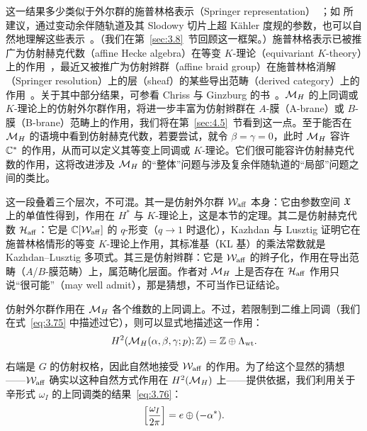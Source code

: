 这一结果多少类似于外尔群的施普林格表示（Springer representation）~\cite{ref26}；如 \cite{ref31} 所建议，通过变动余伴随轨道及其 Slodowy 切片上超 Kähler 度规的参数，也可以自然地理解这些表示~\cite{ref35}。（我们在第~\ref{sec:3.8}~节回顾这一框架。）施普林格表示已被推广为仿射赫克代数（affine Hecke algebra）在等变 $K$-理论（equivariant $K$-theory）上的作用~\cite{ref27,ref28}，最近又被推广为仿射辫群（affine braid group）在施普林格消解（Springer resolution）上的层（sheaf）的某些导出范畴（derived category）上的作用~\cite{ref29}。关于其中部分结果，可参看 Chriss 与 Ginzburg 的书~\cite{ref30}。${{\mathcal{M}}_H}$ 的上同调或 $K$-理论上的仿射外尔群作用，将进一步丰富为仿射辫群在 $A$-膜（A-brane）或 $B$-膜（B-brane）范畴上的作用，我们将在第~\ref{sec:4.5}~节看到这一点。至于能否在 ${{\mathcal{M}}_H}$ 的语境中看到仿射赫克代数，若要尝试，就令 $\beta=\gamma=0$，此时 ${{\mathcal{M}}_H}$ 容许 ${\mathbb{C}}^*$ 的作用，从而可以定义其等变上同调或 $K$-理论。它们很可能容许仿射赫克代数的作用，这将改进涉及 ${{\mathcal{M}}_H}$ 的“整体”问题与涉及复余伴随轨道的“局部”问题之间的类比。

\begin{yizhu}[易错点]
这一段叠着三个层次，不可混。其一是仿射外尔群 ${\mathcal W}_{\rm aff}$ 本身：它由参数空间 $\mathfrak{X}$ 上的单值性得到，作用在 $H^*$ 与 $K$-理论上，这是本节的定理。其二是仿射赫克代数 $\mathcal H_{\rm aff}$：它是 ${\mathbb{C}}[{\mathcal W}_{\rm aff}]$ 的 $q$-形变（$q\to1$ 时退化），Kazhdan 与 Lusztig 证明它在施普林格情形的等变 $K$-理论上作用，其标准基（KL 基）的乘法常数就是 Kazhdan--Lusztig 多项式。其三是仿射辫群：它是 ${\mathcal W}_{\rm aff}$ 的辫子化，作用在导出范畴（$A$/$B$-膜范畴）上，属范畴化层面。作者对 ${{\mathcal{M}}_H}$ 上是否存在 $\mathcal H_{\rm aff}$ 作用只说“很可能”（may well admit），那是猜想，不可当作已证结论。
\end{yizhu}

\bigskip{}

仿射外尔群作用在 ${{\mathcal{M}}_H}$ 各个维数的上同调上。不过，若限制到二维上同调（我们在式~\eqref{eq:3.75} 中描述过它），则可以显式地描述这一作用：
\setcounter{equation}{84}
\begin{equation}\label{eq:3.85}
  H^2({{\mathcal{M}}_H}(\alpha,\beta,\gamma;p);{\mathbb{Z}})={\mathbb{Z}}\oplus \Lambda_{\rm wt}.
\end{equation}

右端是 $G$ 的仿射权格，因此自然地接受 ${\mathcal W}_{\rm aff}$ 的作用。为了给这个显然的猜想——${\mathcal W}_{\rm aff}$ 确实以这种自然方式作用在 $H^2({{\mathcal{M}}_H})$ 上——提供依据，我们利用关于辛形式 $\omega_I$ 的上同调类的结果~\eqref{eq:3.76}：
\setcounter{equation}{85}
\begin{equation}\label{eq:3.86}
  \left[{\omega_I\over 2\pi}\right]=e\oplus (-\alpha^*).
\end{equation}

